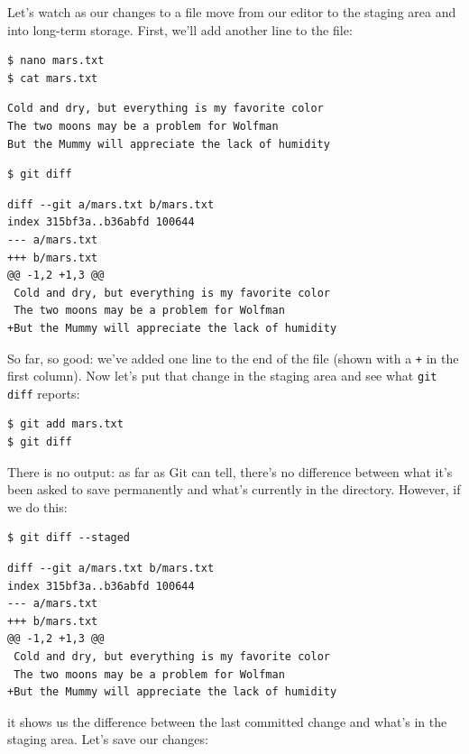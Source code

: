 \documentclass[]{book}
\begin{document}
Let's watch as our changes to a file move from our editor to the staging
area and into long-term storage. First, we'll add another line to the
file:

\begin{verbatim}
$ nano mars.txt
$ cat mars.txt
\end{verbatim}

\begin{verbatim}
Cold and dry, but everything is my favorite color
The two moons may be a problem for Wolfman
But the Mummy will appreciate the lack of humidity
\end{verbatim}

\begin{verbatim}
$ git diff
\end{verbatim}

\begin{verbatim}
diff --git a/mars.txt b/mars.txt
index 315bf3a..b36abfd 100644
--- a/mars.txt
+++ b/mars.txt
@@ -1,2 +1,3 @@
 Cold and dry, but everything is my favorite color
 The two moons may be a problem for Wolfman
+But the Mummy will appreciate the lack of humidity
\end{verbatim}

So far, so good: we've added one line to the end of the file (shown with
a \texttt{+} in the first column). Now let's put that change in the
staging area and see what \texttt{git diff} reports:

\begin{verbatim}
$ git add mars.txt
$ git diff
\end{verbatim}

There is no output: as far as Git can tell, there's no difference
between what it's been asked to save permanently and what's currently in
the directory. However, if we do this:

\begin{verbatim}
$ git diff --staged
\end{verbatim}

\begin{verbatim}
diff --git a/mars.txt b/mars.txt
index 315bf3a..b36abfd 100644
--- a/mars.txt
+++ b/mars.txt
@@ -1,2 +1,3 @@
 Cold and dry, but everything is my favorite color
 The two moons may be a problem for Wolfman
+But the Mummy will appreciate the lack of humidity
\end{verbatim}

it shows us the difference between the last committed change and what's
in the staging area. Let's save our changes:
\end{document}
